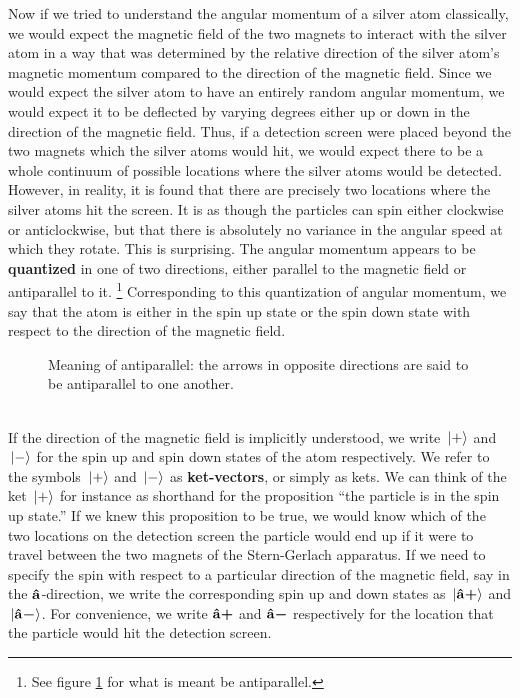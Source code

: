\documentclass[letter, 12pt]{turabian-thesis}
\theoremstyle{hypothesis}
\newcommand{\uvb}[1]{\vb{\hat{{#1}}}}
\newcommand{\uvbp}[1]{\uvb{#1}\bm{+}}
\newcommand{\uvbm}[1]{\uvb{#1}\bm{-}}
\let\origfootnote\footnote %
\renewcommand{\footnote}[1]{%
\noindent %
\origfootnote{#1}}
\begin{document}
Now if we tried to understand the angular momentum of a silver atom classically, we would expect the magnetic field of the two magnets to interact with the silver atom in a way that was determined by the relative direction of the silver atom's magnetic momentum compared to the direction of the magnetic field. Since we would expect the silver atom to have an entirely random angular momentum, we would expect it to be deflected by varying degrees either up or down in the direction of the magnetic field. Thus, if a detection screen were placed beyond the two magnets which the silver atoms would hit, we would expect there to be a whole continuum of possible locations where the silver atoms would be detected. However, in reality, it is found that there are precisely two locations where the silver atoms hit the screen. It is as though the particles can spin either clockwise or anticlockwise, but that there is absolutely no variance in the angular speed at which they rotate. This is surprising. The angular momentum appears to be \textbf{quantized} in one of two directions, either parallel to the magnetic field or antiparallel to it.\footnote{See figure \ref{antiparallel} for what is meant be antiparallel.} Corresponding to this quantization of angular momentum, we say that the atom is either in the spin up state or the spin down state with respect to the direction of the magnetic field. 
\begin{figure}[ht!]
\captionsetup{justification=centering}
\centering
{}
\vspace*{10px}
\caption{Meaning of antiparallel: the arrows in opposite directions are said to be antiparallel to one another.}\label{antiparallel}
\end{figure}\\
 \noindent If the direction of the magnetic field is implicitly understood, we write $\ket*{+}$ and $\ket*{-}$ for the spin up and spin down states of the atom respectively. We refer to the symbols $\ket*{+}$ and $\ket*{-}$ as \textbf{ket-vectors}, or simply as kets. We can think of the ket $\ket*{+}$ for instance as shorthand for the proposition “the particle is in the spin up state.” If we knew this proposition to be true, we would know which of the two locations on the detection screen the particle would end up if it were to travel between the two magnets of the Stern-Gerlach apparatus. If we need to specify the spin with respect to a particular direction of the magnetic field, say in the $\uvb{a}$-direction, we write the corresponding spin up and down states as $\ket*{\uvbp{a}}$ and $\ket*{\uvbm{a}}$. For convenience, we write $\uvbp{a}$ and $\uvbm{a}$ respectively for the location that the particle would hit the detection screen.  
\end{document}
